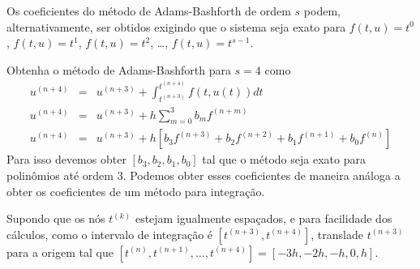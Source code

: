 \begin{obs} Os coeficientes do método de Adams-Bashforth de ordem $s$ podem, alternativamente, ser obtidos exigindo que o sistema seja exato para $f(t,u)=t^0$, $f(t,u)=t^1$, $f(t,u)=t^2$, \ldots, $f(t,u)=t^{s-1}$.

\end{obs}

\begin{ex} Obtenha o método de Adams-Bashforth para $s=4$ como
\begin{eqnarray}
  u^{(n+4)}  &=& u^{(n+3)}  + \int _{t^{(n+3)}}^{t^{(n+4)}} f(t,u(t)) dt \\
  u^{(n+4)}  &=& u^{(n+3)}  + h \sum_{m=0}^{3} b_m f^{(n+m)} \\
  u^{(n+4)}  &=& u^{(n+3)}  + h \left[b_3f^{(n+3)} +b_2f^{(n+2)} +b_1f^{(n+1)} +b_0f^{(n)}\right]
\end{eqnarray}
Para isso devemos obter $[b_3,b_2,b_1,b_0]$ tal que o método seja exato para polinômios até ordem $3$. Podemos obter esses coeficientes de maneira análoga a obter os coeficientes de um método para integração.

Supondo que os nós $t^{(k)}$ estejam igualmente espaçados, e para facilidade dos cálculos, como o intervalo de integração é $[t^{(n+3)},t^{(n+4)}]$, translade $t^{(n+3)}$ para a origem tal que $[t^{(n)},t^{(n+1)},\ldots ,t^{(n+4)}]=[-3h,-2h,-h,0,h]$.


\end{ex}
